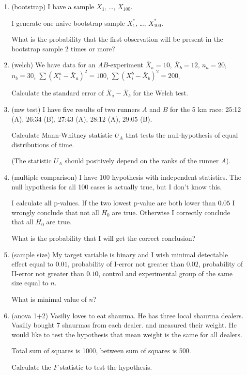 \documentclass[11pt, a4paper]{article}
\theoremstyle{definition}
\begin{document}
\begin{enumerate}
    \item (bootstrap) I have a sample $X_1$, \ldots, $X_{100}$.
    
    I generate one naive bootstrap sample $X^{*}_{1}$, \ldots, $X^{*}_{100}$. 

    What is the probability that the first observation will be present in the bootstrap sample 2 times or more?

    \item (welch) We have data for an $AB$-experiment $\bar X_a = 10$, $\bar X_b = 12$, 
    $n_a = 20$, $n_b = 30$, $\sum (X_i^a - \bar X_a)^2 = 100$, $\sum (X_i^b - \bar X_b)^2 = 200$.

    Calculate the standard error of $\bar X_a - \bar X_b$ for the Welch test. 
    
    \item (mw test) I have five results of two runners $A$ and $B$ for the 5 km race: 25:12 (A), 26:34 (B), 27:43 (A), 28:12 (A), 29:05 (B).
    
    Calculate Mann-Whitney statistic $U_A$ that tests the null-hypothesis of equal distributions of time. 
    
    (The statistic $U_A$ should positively depend on the ranks of the runner $A$). 

    \item (multiple comparison) I have 100 hypothesis with independent statistics. 
    The null hypothesis for all 100 cases is actually true, but I don't know this. 
    
    I calculate all p-values. 
    If the two lowest p-value are both lower than $0.05$ I wrongly conclude that not all $H_0$ are true. 
    Otherwise I correctly conclude that all $H_0$ are true. 

    What is the probability that I will get the correct conclusion?

    \item (sample size) My target variable is binary and I wish 
    minimal detectable effect equal to $0.01$, probability of I-error  not greater than $0.02$, 
    probability of II-error not greater than $0.10$, control and experimental group of the same size equal to $n$.

    What is minimal value of $n$?


    \item (anova 1+2) Vasiliy loves to eat shaurma. He has three local shaurma dealers. Vasiliy bought 7 shaurmas from each dealer. 
    and measured their weight. He would like to test the hypothesis that mean weight is the same for all dealers. 

    Total sum of squares is 1000, between sum of squares is 500. 

    Calculate the $F$-statistic to test the hypothesis.
        
\end{enumerate}
\end{document}
